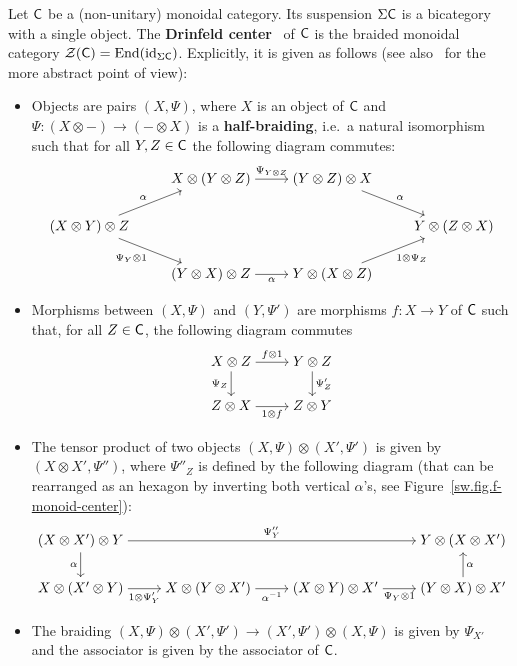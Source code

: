\begin{definition}
  Let $\mathsf{C}$ be a (non-unitary) monoidal category.
  Its suspension $\Sigma \mathsf{C}$ is a bicategory with a single object.
  The \textbf{Drinfeld center}~\cite{Majid1991, JoyalStreet1991} of $\mathsf{C}$ is the braided monoidal category $\mathcal{Z}(\mathsf{C}) = \operatorname{End}(\operatorname{id}_{\Sigma \mathsf{C}})$.
  Explicitly, it is given as follows (see also~\cite{nlab} for the more abstract point of view):
  \begin{itemize}
  \item Objects are pairs $(X, \Psi)$, where $X$ is an object of $\mathsf{C}$ and $\Psi : (X \otimes -) \to (- \otimes X)$ is a \textbf{half-braiding}, i.e.\ a natural isomorphism such that for all $Y,Z \in \mathsf{C}$ the following diagram commutes:
    \[\begin{tikzcd}[cramped]
        {} & X \otimes (Y \otimes Z) \rar{\Psi_{Y \otimes Z}} & (Y
        \otimes Z) \otimes X \drar{\alpha} \\
        (X \otimes Y) \otimes Z \urar{\alpha} \drar[swap]{\Psi_{Y}
          \otimes 1} & {} & {} & Y \otimes (Z \otimes X) \\
        {} & (Y \otimes X) \otimes Z \rar[swap]{\alpha} & Y \otimes (X
        \otimes Z) \urar[swap]{1 \otimes \Psi_{Z}}
      \end{tikzcd}\]
  \item Morphisms between $(X, \Psi)$ and $(Y, \Psi')$ are morphisms $f : X \to Y$ of $\mathsf{C}$ such that, for all $Z \in \mathsf{C}$, the following diagram commutes
    \[\begin{tikzcd}[cramped]
        X \otimes Z \rar{f \otimes 1} \dar[swap]{\Psi_{Z}}
        & Y \otimes Z \dar{\Psi'_{Z}} \\
        Z \otimes X \rar[swap]{1 \otimes f}
        & Z \otimes Y
      \end{tikzcd}\]
  \item The tensor product of two objects $(X, \Psi) \otimes (X', \Psi')$ is given by $(X \otimes X', \Psi'')$, where $\Psi''_{Z}$ is defined by the following diagram (that can be rearranged as an hexagon by inverting both vertical $\alpha$'s, see Figure~\ref{sw.fig.f-monoid-center}):
    \[\begin{tikzcd}[cramped]
        (X \otimes X') \otimes Y \ar{rrr}{\Psi''_{Y}}
        \dar[swap]{\alpha}
        &&& Y \otimes (X \otimes X') \\
        X \otimes (X' \otimes Y) \rar[swap]{1 \otimes \Psi'_{Y}} & X
        \otimes (Y \otimes X') \rar[swap]{\alpha^{-1}} & (X \otimes Y)
        \otimes X' \rar[swap]{\Psi_{Y} \otimes 1} & (Y \otimes X)
        \otimes X' \uar[swap]{\alpha}
      \end{tikzcd}\]
  \item The braiding $(X, \Psi) \otimes (X', \Psi') \to (X', \Psi') \otimes (X, \Psi)$ is given by $\Psi_{X'}$ and the associator is given by the associator of $\mathsf{C}$.
  \end{itemize}
\end{definition}

